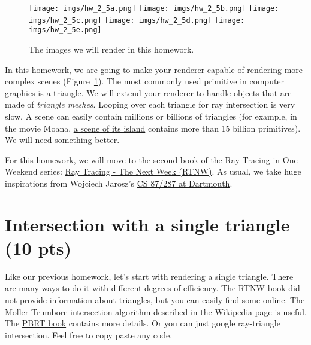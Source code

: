 




\begin{figure}[ht]
    \centering
    \texttt{[image: imgs/hw\_2\_5a.png]}
    \texttt{[image: imgs/hw\_2\_5b.png]}
    \texttt{[image: imgs/hw\_2\_5c.png]}
    \texttt{[image: imgs/hw\_2\_5d.png]}
    \texttt{[image: imgs/hw\_2\_5e.png]}
    \caption{The images we will render in this homework.}
    \label{fig:teaser}
\end{figure}

In this homework, we are going to make your renderer capable of rendering more complex scenes (Figure~\ref{fig:teaser}).
The most commonly used primitive in computer graphics is a triangle. We will extend your renderer to handle objects that are made of \emph{triangle meshes}. Looping over each triangle for ray intersection is very slow. A scene can easily contain millions or billions of triangles (for example, in the movie Moana, \href{https://www.disneyanimation.com/resources/moana-island-scene/}{a scene of its island} contains more than 15 billion primitives). We will need something better.

For this homework, we will move to the second book of the Ray Tracing in One Weekend series: \href{https://raytracing.github.io/books/RayTracingTheNextWeek.html}{Ray Tracing - The Next Week (RTNW)}. As usual, we take huge inspirations from Wojciech Jarosz's \href{https://cs87-dartmouth.github.io/Fall2022/assignments.html}{CS 87/287 at Dartmouth}.

\section{Intersection with a single triangle (10 pts)}
Like our previous homework, let's start with rendering a single triangle. There are many ways to do it with different degrees of efficiency. The RTNW book did not provide information about triangles, but you can easily find some online. The \href{https://en.wikipedia.org/wiki/M%C3%B6ller%E2%80%93Trumbore_intersection_algorithm}{Moller-Trumbore intersection algorithm} described in the Wikipedia page is useful. The \href{https://www.pbr-book.org/3ed-2018/Shapes/Triangle_Meshes#TriangleIntersection}{PBRT book} contains more details.
Or you can just google ray-triangle intersection.
Feel free to copy paste any code.

